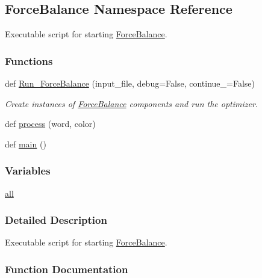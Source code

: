 \hypertarget{namespaceForceBalance}{}\subsection{Force\+Balance Namespace Reference}
\label{namespaceForceBalance}


Executable script for starting \hyperlink{namespaceForceBalance}{Force\+Balance}.  


\subsubsection*{Functions}
\begin{DoxyCompactItemize}
\item 
def \hyperlink{namespaceForceBalance_ab2b0185becf32b01adf8af885ad10345}{Run\+\_\+\+Force\+Balance} (input\+\_\+file, debug=False, continue\+\_\+=False)
\begin{DoxyCompactList}\small\item\em Create instances of \hyperlink{namespaceForceBalance}{Force\+Balance} components and run the optimizer. \end{DoxyCompactList}\item 
def \hyperlink{namespaceForceBalance_aeface9fd43380d545db733e53e828485}{process} (word, color)
\item 
def \hyperlink{namespaceForceBalance_a4ae50d1240ec44e372982a19bd9be35e}{main} ()
\end{DoxyCompactItemize}
\subsubsection*{Variables}
\begin{DoxyCompactItemize}
\item 
\hyperlink{namespaceForceBalance_ade5c4134470535272ce69775da10bcc3}{all}
\end{DoxyCompactItemize}


\subsubsection{Detailed Description}
Executable script for starting \hyperlink{namespaceForceBalance}{Force\+Balance}. 



\subsubsection{Function Documentation}
\mbox{\label{namespaceForceBalance_a4ae50d1240ec44e372982a19bd9be35e}} 
